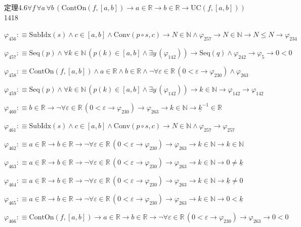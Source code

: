 \begin{fullproof}{定理4.6}{$\forall f\,\forall a\,\forall b\,(\mathrm{ContOn}(f,[a,b]) \to a \in \mathbb{R} \to b \in \mathbb{R} \to \mathrm{UC}(f,[a,b]))$}{1418}
\begin{abbrevlist}
\item $\varphi_{456} :\equiv \mathrm{SubIdx}(s) \land c \in [a,b] \land \mathrm{Conv}(p \circ s,c) \to N \in \mathbb{N} \land \varphi_{257} \to N \in \mathbb{N} \to N \leq N \to \varphi_{234}$
\item $\varphi_{457} :\equiv \mathrm{Seq}(p) \land \forall k \in \mathbb{N}\,(p(k) \in [a,b] \land \exists y\,(\varphi_{142})) \to \mathrm{Seq}(q) \land \varphi_{242} \to \varphi_{5} \to 0 < 0$
\item $\varphi_{458} :\equiv \mathrm{ContOn}(f,[a,b]) \land a \in \mathbb{R} \land b \in \mathbb{R} \land \neg \forall \varepsilon \in \mathbb{R}\,(0 < \varepsilon \to \varphi_{230}) \land \varphi_{263}$
\item $\varphi_{459} :\equiv \mathrm{Seq}(p) \land \forall k \in \mathbb{N}\,(p(k) \in [a,b] \land \exists y\,(\varphi_{142})) \to k \in \mathbb{N} \to \varphi_{142} \to \varphi_{142}$
\item $\varphi_{460} :\equiv b \in \mathbb{R} \to \neg \forall \varepsilon \in \mathbb{R}\,(0 < \varepsilon \to \varphi_{230}) \to \varphi_{263} \to k \in \mathbb{N} \to \underline{k}^{-1} \in \mathbb{R}$
\item $\varphi_{461} :\equiv \mathrm{SubIdx}(s) \land c \in [a,b] \land \mathrm{Conv}(p \circ s,c) \to N \in \mathbb{N} \land \varphi_{257} \to \varphi_{257}$
\item $\varphi_{462} :\equiv a \in \mathbb{R} \to b \in \mathbb{R} \to \neg \forall \varepsilon \in \mathbb{R}\,(0 < \varepsilon \to \varphi_{230}) \to \varphi_{263} \to k \in \mathbb{N} \to k \in \mathbb{N}$
\item $\varphi_{463} :\equiv a \in \mathbb{R} \to b \in \mathbb{R} \to \neg \forall \varepsilon \in \mathbb{R}\,(0 < \varepsilon \to \varphi_{230}) \to \varphi_{263} \to k \in \mathbb{N} \to 0 \neq \underline{k}$
\item $\varphi_{464} :\equiv a \in \mathbb{R} \to b \in \mathbb{R} \to \neg \forall \varepsilon \in \mathbb{R}\,(0 < \varepsilon \to \varphi_{230}) \to \varphi_{263} \to k \in \mathbb{N} \to \underline{k} \neq 0$
\item $\varphi_{465} :\equiv a \in \mathbb{R} \to b \in \mathbb{R} \to \neg \forall \varepsilon \in \mathbb{R}\,(0 < \varepsilon \to \varphi_{230}) \to \varphi_{263} \to k \in \mathbb{N} \to 0 < \underline{k}$
\item $\varphi_{466} :\equiv \mathrm{ContOn}(f,[a,b]) \to a \in \mathbb{R} \to b \in \mathbb{R} \to \neg \forall \varepsilon \in \mathbb{R}\,(0 < \varepsilon \to \varphi_{230}) \to \varphi_{263} \to 0 < 0$

\end{abbrevlist}
\end{fullproof}
